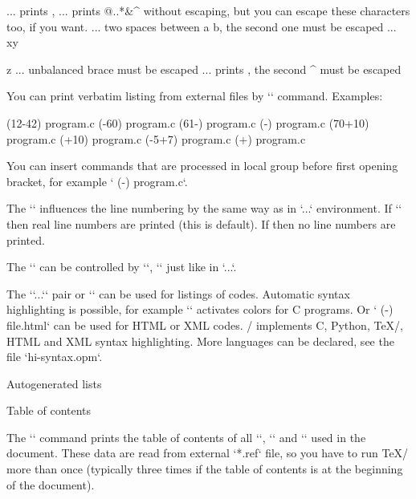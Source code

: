 \begtt
\code{\\text, \%\#} ... prints \text, %
  ... prints @{..}*&^$ $ without escaping, but you can
                        escape these characters too, if you want.
        ... two spaces between a  b, the second one must be escaped
        ... xy{z ... unbalanced brace must be escaped
         ... prints ^^M, the second ^ must be escaped
\endtt

You can print verbatim listing from external files by `\verbinput` command. 
Examples:

\begtt
\verbinput (12-42) program.c  %
\verbinput (-60) program.c    % print from begin to the line 60
\verbinput (61-) program.c    % from line 61 to the end
\verbinput (-) program.c      % whole file is printed
\verbinput (70+10) program.c  % from line 70, only 10 lines printed
\verbinput (+10) program.c    % from the last line read, print 10 lines 
\verbinput (-5+7) program.c   % from the last line read, skip 5, print 7
\verbinput (+) program.c      % from the last line read to the end
\endtt

\new
You can insert commands that are processed in local group before
first opening bracket, for example `\verbinput \hsize=20cm (-) program.c`.

The `\ttline` influences the line numbering by the same way as in
`\begtt...\endtt` environment. If `` then real line numbers are
printed (this is default). If  then no line 
numbers are printed.

The `\verbinput` can be controlled by `\everytt`, `\ttindent` just like
in `\begtt...\endtt`.

The `\begtt`...`\endtt` pair or `\verbinput` can be used for listings of
codes. Automatic syntax highlighting is possible, for example
`\begtt {}` activates colors for C programs. Or
`\verinput {} (-) file.html` can be used for HTML or XML codes. 
\OpTeX/ implements C, Python, \TeX/, HTML and XML syntax highlighting.
More languages can be declared, see the file `hi-syntax.opm`. 


\sec Autogenerated lists

\secc[toc] Table of contents

The `\maketoc` command prints the table of contents of all `\chap`, `\sec`
and `\secc` used in the document. These data are read from external `*.ref` file, so
you have to run \TeX/ more than once (typically three times if the table of
contents is at the beginning of the document). 

}
